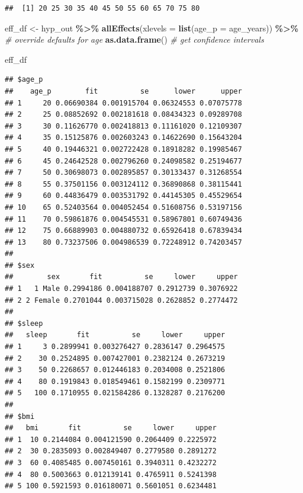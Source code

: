 \documentclass[
]{book}
\newenvironment{Shaded}{\begin{snugshade}}{\end{snugshade}}
\newcommand{\CommentTok}[1]{\textcolor[rgb]{0.56,0.35,0.01}{\textit{#1}}}
\newcommand{\DataTypeTok}[1]{\textcolor[rgb]{0.13,0.29,0.53}{#1}}
\newcommand{\KeywordTok}[1]{\textcolor[rgb]{0.13,0.29,0.53}{\textbf{#1}}}
\newcommand{\NormalTok}[1]{#1}
\newcommand{\OperatorTok}[1]{\textcolor[rgb]{0.81,0.36,0.00}{\textbf{#1}}}
\newcommand{\StringTok}[1]{\textcolor[rgb]{0.31,0.60,0.02}{#1}}
\begin{document}
\begin{verbatim}
##  [1] 20 25 30 35 40 45 50 55 60 65 70 75 80
\end{verbatim}

\begin{Shaded}
\begin{Highlighting}[]
\NormalTok{  eff\_df \textless{}{-}}\StringTok{ }
\StringTok{      }\NormalTok{hyp\_out }\OperatorTok{\%\textgreater{}\%}\StringTok{ }
\StringTok{      }\KeywordTok{allEffects}\NormalTok{(}\DataTypeTok{xlevels =} \KeywordTok{list}\NormalTok{(}\DataTypeTok{age\_p =}\NormalTok{ age\_years)) }\OperatorTok{\%\textgreater{}\%}\StringTok{ }\CommentTok{\# override defaults for age}
\StringTok{      }\KeywordTok{as.data.frame}\NormalTok{() }\CommentTok{\# get confidence intervals}
  
\NormalTok{  eff\_df}
\end{Highlighting}
\end{Shaded}

\begin{verbatim}
## $age_p
##    age_p        fit          se      lower      upper
## 1     20 0.06690384 0.001915704 0.06324553 0.07075778
## 2     25 0.08852692 0.002181618 0.08434323 0.09289708
## 3     30 0.11626770 0.002418813 0.11161020 0.12109307
## 4     35 0.15125876 0.002603243 0.14622690 0.15643204
## 5     40 0.19446321 0.002722428 0.18918282 0.19985467
## 6     45 0.24642528 0.002796260 0.24098582 0.25194677
## 7     50 0.30698073 0.002895857 0.30133437 0.31268554
## 8     55 0.37501156 0.003124112 0.36890868 0.38115441
## 9     60 0.44836479 0.003531792 0.44145305 0.45529654
## 10    65 0.52403564 0.004052454 0.51608756 0.53197156
## 11    70 0.59861876 0.004545531 0.58967801 0.60749436
## 12    75 0.66889903 0.004880732 0.65926418 0.67839434
## 13    80 0.73237506 0.004986539 0.72248912 0.74203457
## 
## $sex
##        sex       fit          se     lower     upper
## 1   1 Male 0.2994186 0.004188707 0.2912739 0.3076922
## 2 2 Female 0.2701044 0.003715028 0.2628852 0.2774472
## 
## $sleep
##   sleep       fit          se     lower     upper
## 1     3 0.2899941 0.003276427 0.2836147 0.2964575
## 2    30 0.2524895 0.007427001 0.2382124 0.2673219
## 3    50 0.2268657 0.012446183 0.2034008 0.2521806
## 4    80 0.1919843 0.018549461 0.1582199 0.2309771
## 5   100 0.1710955 0.021584286 0.1328287 0.2176200
## 
## $bmi
##   bmi       fit          se     lower     upper
## 1  10 0.2144084 0.004121590 0.2064409 0.2225972
## 2  30 0.2835093 0.002849407 0.2779580 0.2891272
## 3  60 0.4085485 0.007450161 0.3940311 0.4232272
## 4  80 0.5003663 0.012139141 0.4765911 0.5241398
## 5 100 0.5921593 0.016180071 0.5601051 0.6234481
\end{verbatim}
\end{document}
